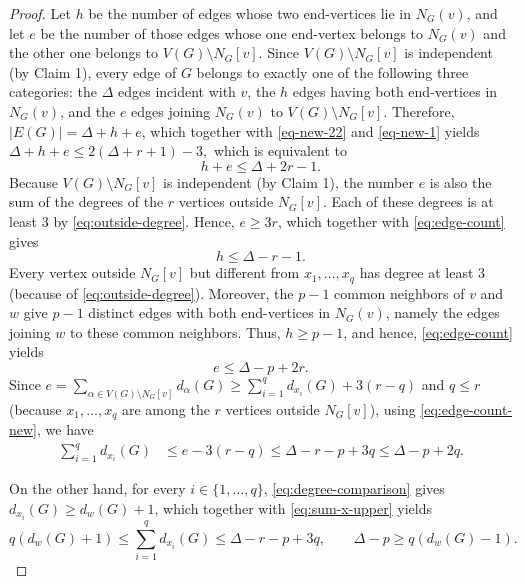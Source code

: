 \documentclass[10pt,a4paper]{amsart}
\begin{document}
\begin{proof}
Let $h$ be
the number of edges whose two end-vertices lie in $N_G(v)$, and let $e$ be
the number of those edges whose one end-vertex belongs to $N_G(v)$ and the other one belongs to $V(G)\setminus N_G[v]$. Since $V(G)\setminus N_G[v]$ is independent (by Claim 1), every edge of $G$ belongs to exactly one of
the following three categories: the $\Delta$ edges incident with $v$, the
$h$ edges having both end-vertices in $N_G(v)$, and the $e$ edges
joining $N_G(v)$ to $V(G)\setminus N_G[v]$. Therefore,
$|E(G)|=\Delta+h+e$, which together with \eqref{eq-new-22} and  \eqref{eq-new-1} yields
$\Delta+h+e\le2(\Delta+r+1)-3,$
which is equivalent to
\begin{equation}\label{eq:edge-count}
h+e\le\Delta+2r-1.
\end{equation}
Because $V(G)\setminus N_G[v]$ is independent (by Claim 1), the number $e$ is also
the sum of the degrees of the $r$ vertices outside $N_G[v]$. Each of
these degrees is at least $3$ by \eqref{eq:outside-degree}. Hence,
$e\ge3r$, which together with \eqref{eq:edge-count} gives
\begin{equation}\label{eq-new-03}
h\le\Delta-r-1.
\end{equation}
Every vertex outside $N_G[v]$ but different from $x_1,\ldots,x_q$ has
degree at least $3$ (because of  \eqref{eq:outside-degree}). Moreover, the $p-1$ common neighbors of $v$ and
$w$ give $p-1$ distinct edges with both end-vertices in $N_G(v)$, namely the edges joining
$w$ to these common neighbors. Thus, $h\ge p-1$, and hence, \eqref{eq:edge-count} yields
\begin{equation}\label{eq:edge-count-new}
e\le\Delta-p+2r.
\end{equation}
Since $e=\sum_{\alpha\in V(G)\setminus N_G[v]}d_{\alpha}(G)\ge\sum_{i=1}^{q}d_{x_i}(G)+3(r-q)$ and $q\le r$ (because $x_1,\ldots,x_q$ are among the $r$ vertices outside
$N_G[v]$), using \eqref{eq:edge-count-new}, we have
\begin{align}
\sum_{i=1}^{q}d_{x_i}(G)
&\le e-3(r-q)\le\Delta-r-p+3q\le\Delta-p+2q.
\label{eq:sum-x-upper}
\end{align}

On the other hand, for every $i\in\{1,\dots,q\}$, \eqref{eq:degree-comparison} gives
$d_{x_i}(G)\ge d_w(G)+1$, which together with
\eqref{eq:sum-x-upper} yields
\begin{equation}\label{eq:delta-p-lower}
q(d_w(G)+1)\le\sum_{i=1}^{q}d_{x_i}(G)
\le\Delta-r-p+3q,
\qquad \Delta-p\ge q(d_w(G)-1).
\end{equation}


\end{proof}
\end{document}
